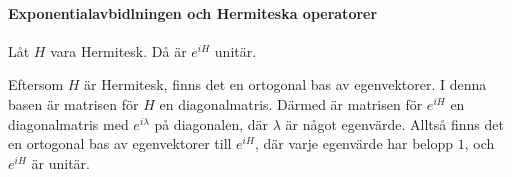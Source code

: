\paragraph{Exponentialavbidlningen och Hermiteska operatorer}
Låt $H$ vara Hermitesk. Då är $e^{iH}$ unitär.

\proof
Eftersom $H$ är Hermitesk, finns det en ortogonal bas av egenvektorer. I denna basen är matrisen för $H$ en diagonalmatris. Därmed är matrisen för $e^{iH}$ en diagonalmatris med $e^{i\lambda}$ på diagonalen, där $\lambda$ är något egenvärde. Alltså finns det en ortogonal bas av egenvektorer till $e^{iH}$, där varje egenvärde har belopp $1$, och $e^{iH}$ är unitär.